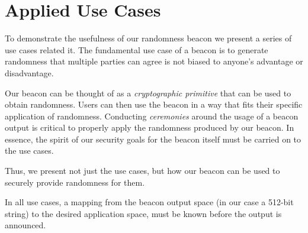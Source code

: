\section{Applied Use Cases}
To demonstrate the usefulness of our randomness beacon we present a series of use cases related it.
The fundamental use case of a beacon is to generate randomness that multiple parties can agree is not biased to anyone's advantage or disadvantage.

Our beacon can be thought of as a \emph{cryptographic primitive} that can be used to obtain randomness.
Users can then use the beacon in a way that fits their specific application of randomness.
Conducting \emph{ceremonies} around the usage of a beacon output is critical to properly apply the randomness produced by our beacon.
In essence, the spirit of our security goals for the beacon itself must be carried on to the use cases.

Thus, we present not just the use cases, but how our beacon can be used to securely provide randomness for them.

In all use cases, a mapping from the beacon output space (in our case a 512-bit string) to the desired application space, must be known before the output is announced.

